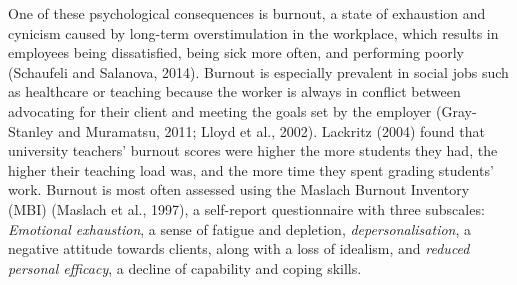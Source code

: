 \documentclass[
  english,
  man,floatsintext]{apa6}
\begin{document}
One of these psychological consequences is burnout, a state of exhaustion and cynicism caused by long-term overstimulation in the workplace, which results in employees being dissatisfied, being sick more often, and performing poorly (Schaufeli and Salanova, 2014).
Burnout is especially prevalent in social jobs such as healthcare or teaching because the worker is always in conflict between advocating for their client and meeting the goals set by the employer (Gray-Stanley and Muramatsu, 2011; Lloyd et al., 2002).
Lackritz (2004) found that university teachers' burnout scores were higher the more students they had, the higher their teaching load was, and the more time they spent grading students' work.
Burnout is most often assessed using the Maslach Burnout Inventory (MBI) (Maslach et al., 1997), a self-report questionnaire with three subscales: \emph{Emotional exhaustion}, a sense of fatigue and depletion, \emph{depersonalisation}, a negative attitude towards clients, along with a loss of idealism, and \emph{reduced personal efficacy}, a decline of capability and coping skills.
\end{document}
